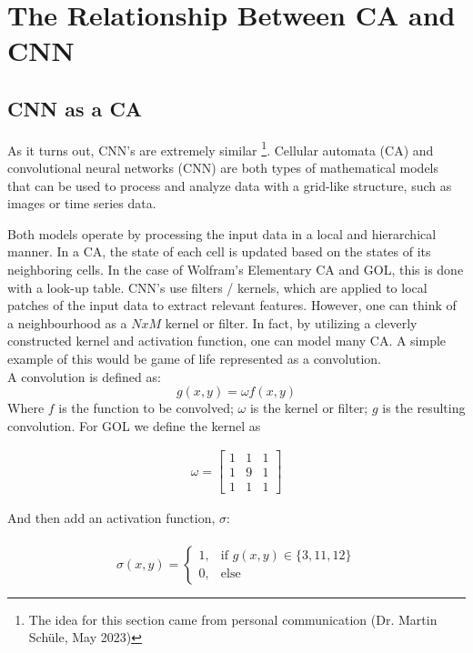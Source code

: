 \section{The Relationship Between CA and CNN}
\label{ca-cnn}
\subsection{CNN as a CA}
As it turns out, CNN's are extremely similar \footnote{The idea for this section came from personal communication (Dr. Martin Schüle, May 2023)}. Cellular automata (CA) and convolutional neural networks (CNN) are both types of mathematical models that can be used to process and analyze data with a grid-like structure, such as images or time series data. \cite{PhysRevE}

Both models operate by processing the input data in a local and hierarchical manner. In a CA, the state of each cell is updated based on the states of its neighboring cells. In the case of Wolfram's Elementary CA and GOL, this is done with a look-up table. CNN's use filters / kernels, which are applied to local patches of the input data to extract relevant features. However, one can think of a neighbourhood as a $NxM$ kernel or filter. In fact, by utilizing a cleverly constructed kernel and activation function, one can model many CA. A simple example of this would be game of life represented as a convolution. \\

A convolution is defined as: \\

\begin{equation*}
	g(x,y) = \omega f(x, y)
\end{equation*}
Where $f$ is the function to be convolved; $\omega$ is the kernel or filter; $g$ is the resulting convolution. For GOL we define the kernel as

\begin{gather*}
	\omega = 
	\begin{bmatrix}
		1 & 1 & 1 \\
		1 & 9 & 1 \\
		1 & 1 & 1
	\end{bmatrix}
\end{gather*}


And then add an activation function, $\sigma$: \\ \\

\begin{equation}
	\sigma(x, y) = \begin{cases}
		1, & \text{if } g(x, y) \in \{3, 11, 12\} \\
		0, & \text{else}
	\end{cases}
\end{equation}

